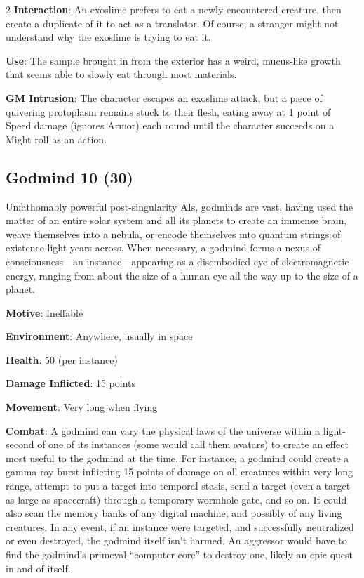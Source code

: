 \begin{multicols}{2}
\textbf{Interaction}: An exoslime prefers to eat a newly-encountered creature, then create a duplicate of it to act as a translator. Of course, a stranger might not understand why the exoslime is trying to eat it. 

\textbf{Use}: The sample brought in from the exterior has a weird, mucus-like growth that seems able to slowly eat through most materials.

\textbf{GM Intrusion}: The character escapes an exoslime attack, but a piece of quivering protoplasm remains stuck to their flesh, eating away at 1 point of Speed damage (ignores Armor) each round until the character succeeds on a Might roll as an action.

\subsection{Godmind 10 (30)}

Unfathomably powerful post-singularity AIs, godminds are vast, having used the matter of an entire solar system and all its planets to create an immense brain, weave themselves into a nebula, or encode themselves into quantum strings of existence light-years across. When necessary, a godmind forms a nexus of consciousness—an instance—appearing as a disembodied eye of electromagnetic energy, ranging from about the size of a human eye all the way up to the size of a planet. 

\textbf{Motive}: Ineffable 

\textbf{Environment}: Anywhere, usually in space 

\textbf{Health}: 50 (per instance) 

\textbf{Damage Inflicted}:  15 points 

\textbf{Movement}: Very long when flying 

\textbf{Combat}: A godmind can vary the physical laws of the universe within a light-second of one of its instances (some would call them avatars) to create an effect most useful to the godmind at the time. For instance, a godmind could create a gamma ray burst inflicting 15 points of damage on all creatures within very long range, attempt to put a target into temporal stasis, send a target (even a target as large as spacecraft) through a temporary wormhole gate, and so on. It could also scan the memory banks of any digital machine, and possibly of any living creatures. In any event, if an instance were targeted, and successfully neutralized or even destroyed, the godmind itself isn’t harmed. An aggressor would have to find the godmind’s primeval “computer core” to destroy one, likely an epic quest in and of itself. 


\end{multicols}
